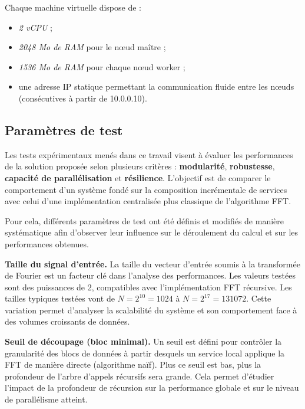Chaque machine virtuelle dispose de :
\begin{itemize}
  \item \textit{2 vCPU} ;
  \item \textit{2048 Mo de RAM} pour le nœud maître ;
  \item \textit{1536 Mo de RAM} pour chaque nœud worker ;
  \item une adresse IP statique permettant la communication fluide entre les nœuds (consécutives à partir de 10.0.0.10).
\end{itemize}

\subsection{Paramètres de test}{}
Les tests expérimentaux menés dans ce travail visent à évaluer les performances de la solution proposée selon plusieurs critères : \textbf{modularité}, \textbf{robustesse}, \textbf{capacité de parallélisation} et \textbf{résilience}. L’objectif est de comparer le comportement d’un système fondé sur la composition incrémentale de services avec celui d’une implémentation centralisée plus classique de l’algorithme FFT.

Pour cela, différents paramètres de test ont été définis et modifiés de manière systématique afin d’observer leur influence sur le déroulement du calcul et sur les performances obtenues.

\textbf{Taille du signal d’entrée.}
La taille du vecteur d’entrée soumis à la transformée de Fourier est un facteur clé dans l’analyse des performances. Les valeurs testées sont des puissances de 2, compatibles avec l’implémentation FFT récursive. Les tailles typiques testées vont de $N=2^{10}=1024$ à $N=2^{17}=131072$. Cette variation permet d’analyser la scalabilité du système et son comportement face à des volumes croissants de données.

\textbf{Seuil de découpage (bloc minimal).}
Un seuil est défini pour contrôler la granularité des blocs de données à partir desquels un service local applique la FFT de manière directe (algorithme naïf). Plus ce seuil est bas, plus la profondeur de l’arbre d’appels récursifs sera grande.
Cela permet d’étudier l'impact de la profondeur de récursion sur la performance globale et sur le niveau de parallélisme atteint.

